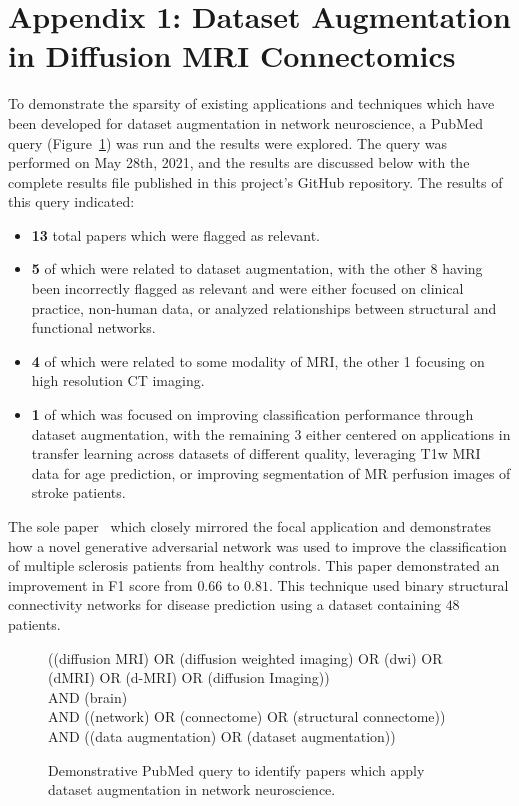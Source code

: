\documentclass[10pt]{SelfArx} %
\newcommand{\new}[1]{\color{blue}#1\color{black}\xspace}
\begin{document}
\clearpage
\onecolumn
\new{
\section*{Appendix 1: Dataset Augmentation in Diffusion MRI Connectomics}
\label{app:augmentation}

To demonstrate the sparsity of existing applications and techniques which have been developed for dataset augmentation
in network neuroscience, a PubMed query (Figure~\ref{pubmedquery}) was run and the results were explored. The query was
performed on May 28th, 2021, and the results are discussed below with the complete results file published in this
project's GitHub repository. The results of this query indicated:

\begin{itemize}
\item \textbf{13} total papers which were flagged as relevant.
\item \textbf{5} of which were related to dataset augmentation, with the other 8 having been incorrectly flagged as
relevant and were either focused on clinical practice, non-human data, or analyzed relationships between structural and
functional networks.
\item \textbf{4} of which were related to some modality of MRI, the other 1 focusing on high resolution CT imaging.
\item \textbf{1} of which was focused on improving classification performance through dataset augmentation, with the
remaining 3 either centered on applications in transfer learning across datasets of different quality, leveraging T1w
MRI data for age prediction, or improving segmentation of MR perfusion images of stroke patients.
\end{itemize}

The sole paper~\cite{barile2021data} which closely mirrored the focal application and demonstrates how a novel
generative adversarial network was used to improve the classification of multiple sclerosis patients from healthy
controls. This paper demonstrated an improvement in F1 score from $0.66$ to $0.81$. This technique used binary
structural connectivity networks for disease prediction using a dataset containing $48$ patients.

\begin{figure}[h!]
\begin{tcolorbox}\centering
((diffusion MRI) OR (diffusion weighted imaging) OR (dwi) OR (dMRI) OR (d-MRI) OR (diffusion Imaging))\\
AND (brain)\\
AND ((network) OR (connectome) OR (structural connectome))\\
AND ((data augmentation) OR (dataset augmentation))
\end{tcolorbox}
\caption{Demonstrative PubMed query to identify papers which apply dataset augmentation in network neuroscience.}
\label{pubmedquery}
\end{figure}
}
\end{document}
